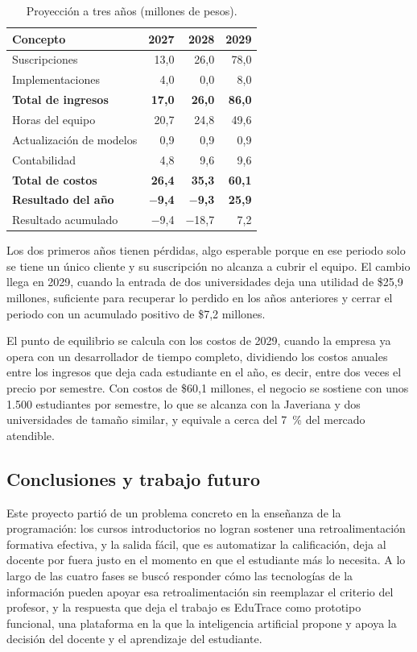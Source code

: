 \documentclass[letterpaper, 10 pt, conference]{ieeeconf}
\begin{document}
\begin{table}[htbp]
\centering
\small
\caption{Proyección a tres años (millones de pesos).}
\label{tab:proyeccion}
\begin{tabular}{|p{4.9cm}|r|r|r|}
\hline
\textbf{Concepto} & \textbf{2027} & \textbf{2028} & \textbf{2029} \\
\hline
Suscripciones & 13,0 & 26,0 & 78,0 \\
Implementaciones & 4,0 & 0,0 & 8,0 \\
\hline
\textbf{Total de ingresos} & \textbf{17,0} & \textbf{26,0} & \textbf{86,0} \\
\hline
Horas del equipo & 20,7 & 24,8 & 49,6 \\
Actualización de modelos & 0,9 & 0,9 & 0,9 \\
Contabilidad & 4,8 & 9,6 & 9,6 \\
\hline
\textbf{Total de costos} & \textbf{26,4} & \textbf{35,3} & \textbf{60,1} \\
\hline
\textbf{Resultado del año} & \textbf{$-$9,4} & \textbf{$-$9,3} & \textbf{25,9} \\
Resultado acumulado & $-$9,4 & $-$18,7 & 7,2 \\
\hline
\end{tabular}
\end{table}

Los dos primeros años tienen pérdidas, algo esperable porque en ese periodo solo se tiene un único cliente y su suscripción no alcanza a cubrir el equipo.
El cambio llega en 2029, cuando la entrada de dos universidades deja una utilidad de \$25,9 millones, suficiente para recuperar lo perdido en los años anteriores y cerrar el periodo con un acumulado positivo de \$7,2 millones.

El punto de equilibrio se calcula con los costos de 2029, cuando la empresa ya opera con un desarrollador de tiempo completo, dividiendo los costos anuales entre los ingresos que deja cada estudiante en el año, es decir, entre dos veces el precio por semestre.
Con costos de \$60,1 millones, el negocio se sostiene con unos 1.500 estudiantes por semestre, lo que se alcanza con la Javeriana y dos universidades de tamaño similar, y equivale a cerca del 7~\% del mercado atendible.


\subsection{Conclusiones y trabajo futuro}
Este proyecto partió de un problema concreto en la enseñanza de la programación: los cursos introductorios no logran sostener una retroalimentación formativa efectiva, y la salida fácil, que es automatizar la calificación, deja al docente por fuera justo en el momento en que el estudiante más lo necesita.
A lo largo de las cuatro fases se buscó responder cómo las tecnologías de la información pueden apoyar esa retroalimentación sin reemplazar el criterio del profesor, y la respuesta que deja el trabajo es EduTrace como prototipo funcional, una plataforma en la que la inteligencia artificial propone y apoya la decisión del docente y el aprendizaje del estudiante.
\end{document}
